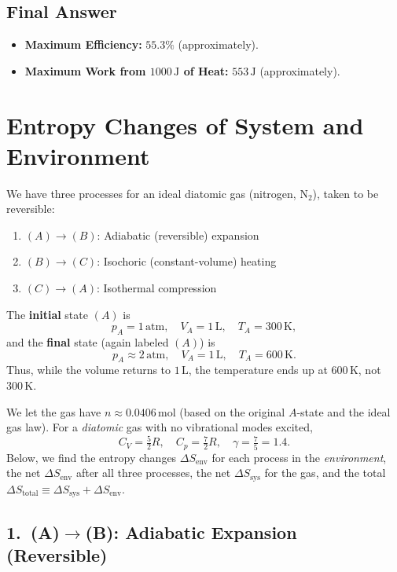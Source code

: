 \documentclass[12pt]{article}
\theoremstyle{definition} %
\theoremstyle{plain} %
\begin{document}
\subsection*{Final Answer}
\begin{itemize}
    \item \textbf{Maximum Efficiency:} $\displaystyle 55.3\%$ (approximately).
    \item \textbf{Maximum Work from $1000\,\text{J}$ of Heat:} $\displaystyle 553\,\text{J}$ (approximately).
\end{itemize}

\section*{Entropy Changes of System and Environment}

We have three processes for an ideal diatomic gas (nitrogen, \(\mathrm{N}_2\)), taken to be reversible:

\begin{enumerate}
  \item \((A)\!\to\!(B)\): Adiabatic (reversible) expansion
  \item \((B)\!\to\!(C)\): Isochoric (constant-volume) heating
  \item \((C)\!\to\!(A)\): Isothermal compression
\end{enumerate}

The \textbf{initial} state \((A)\) is 
\[
p_A=1\,\mathrm{atm},\quad V_A=1\,\mathrm{L},\quad T_A=300\,\mathrm{K},
\]
and the \textbf{final} state (again labeled \((A)\)) is 
\[
p_A\approx 2\,\mathrm{atm},\quad V_A=1\,\mathrm{L},\quad T_A=600\,\mathrm{K}.
\]
Thus, while the volume returns to \(1\,\mathrm{L}\), the temperature ends up at \(600\,\mathrm{K}\), not \(300\,\mathrm{K}\).  

We let the gas have \(n\approx 0.0406\,\mathrm{mol}\) (based on the original \(A\)-state and the ideal gas law).  For a \emph{diatomic} gas with no vibrational modes excited, 
\[
C_V = \tfrac{5}{2}R, 
\quad
C_p = \tfrac{7}{2}R,
\quad
\gamma = \tfrac{7}{5} = 1.4.
\]
Below, we find the entropy changes \(\Delta S_{\mathrm{env}}\) for each process in the \emph{environment}, the net \(\Delta S_{\mathrm{env}}\) after all three processes, the net \(\Delta S_{\mathrm{sys}}\) for the gas, and the total \(\Delta S_{\text{total}}\equiv \Delta S_{\mathrm{sys}} + \Delta S_{\mathrm{env}}\).

\subsection*{1.\ (A)\(\to\)(B): Adiabatic Expansion (Reversible)}
\end{document}
